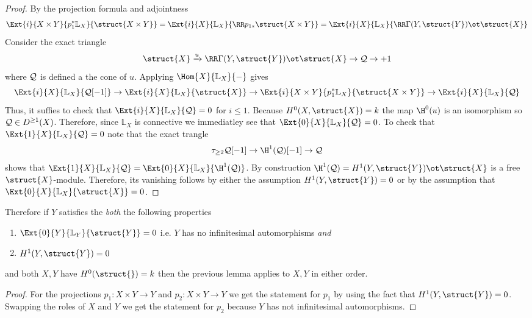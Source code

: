 \documentclass[12pt]{article}
\newcommand{\LL}{\mathbb{L}}
\begin{document}
\begin{proof}
By the projection formula and adjointness
\[ \Ext{i}{X \times Y}{p_1^* \LL_X}{\struct{X \times Y}} = \Ext{i}{X}{\LL_X}{\RR p_{1*} \struct{X \times Y}} = \Ext{i}{X}{\LL_X}{\RR \Gamma(Y, \struct{Y}) \ot \struct{X}} \]
Consider the exact triangle
\[ \struct{X} \xrightarrow{u} \RR \Gamma(Y, \struct{Y}) \ot \struct{X} \to \cQ \to + 1 \]
where $\mathcal{Q}$ is defined a the cone of $u$. Applying $\Hom{X}{\LL_X}{-}$ gives
\[ \Ext{i}{X}{\LL_X}{\cQ[-1]} \to \Ext{i}{X}{\LL_X}{\struct{X}} \to \Ext{i}{X \times Y}{p_1^* \LL_X}{\struct{X \times Y}} \to \Ext{i}{X}{\LL_X}{\cQ} \]
Thus, it suffies to check that $\Ext{i}{X}{\LL_X}{\cQ} = 0$ for $i \le 1$. Because $H^0(X, \struct{X}) = k$ the map $\H^0(u)$ is an isomorphism so $\mathcal{Q} \in D^{\ge 1}(X)$. Therefore, since $\LL_X$ is connective we immediatley see that $\Ext{0}{X}{\LL_X}{\cQ} = 0$. To check that $\Ext{1}{X}{\LL_X}{\cQ} = 0$ note that the exact trangle
\[ \tau_{\ge 2} \cQ[-1] \to \H^1(\cQ)[-1] \to \cQ \]
shows that $\Ext{1}{X}{\LL_X}{\cQ} = \Ext{0}{X}{\LL_X}{\H^1(\cQ)}$. By construction $\H^1(\cQ) = H^1(Y, \struct{Y}) \ot \struct{X}$ is a free $\struct{X}$-module. Therefore, its vanishing follows by either the assumption $H^1(Y, \struct{Y}) = 0$ or by the assumption that $\Ext{0}{X}{\LL_X}{\struct{X}} = 0$.  
\end{proof}

\begin{cor} \label{cor:ext_product_basechange_asymmetric}
Therefore if $Y$ satisfies the \textit{both} the following properties
\begin{enumerate}
\item $\Ext{0}{Y}{\LL_Y}{\struct{Y}} = 0$ i.e. $Y$ has no infinitesimal automorphisms \textit{and}
\item $H^1(Y, \struct{Y}) = 0$
\end{enumerate}
and both $X,Y$ have $H^0(\struct{}) = k$ then the previous lemma applies to $X,Y$ in either order. 
\end{cor}

\begin{proof}
For the projections $p_1 : X \times Y \to Y$ and $p_2 : X \times Y \to Y$ we get the statement for $p_1$ by using the fact that $H^1(Y, \struct{Y}) = 0$. Swapping the roles of $X$ and $Y$ we get the statement for $p_2$ because $Y$ has not infinitesimal automorphisms. 
\end{proof}


\newcommand{\Def}{\mathrm{Def}}
\newcommand{\Art}{\mathrm{Art}}
\newcommand{\Y}{\mathcal{Y}}
\end{document}
